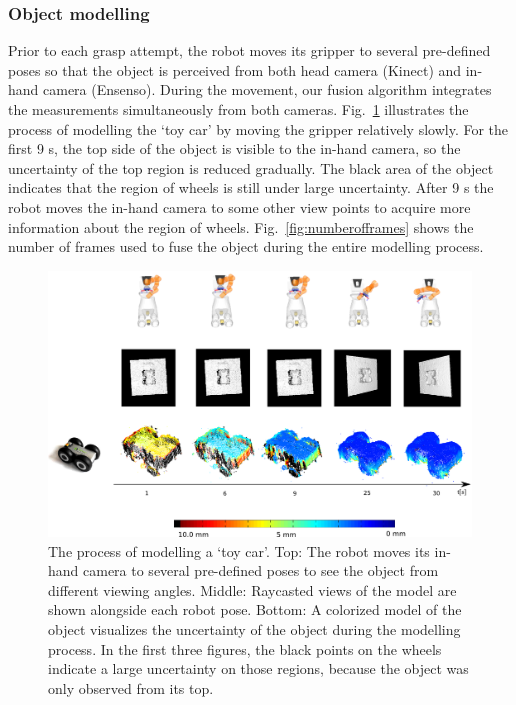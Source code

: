 \subsubsection{Object modelling}
Prior to each grasp attempt, the robot moves its gripper to several pre-defined poses so that the object is perceived from both head camera (Kinect) and in-hand camera (Ensenso). During the movement, our fusion algorithm integrates the measurements simultaneously from both cameras. Fig.~\ref{fig:time_evolution} illustrates the process of modelling the `toy car' by moving the gripper relatively slowly. For the first 9 s, the top side of the object is visible to the in-hand camera, so the uncertainty of the top region is reduced gradually. The black area of the object indicates that the region of wheels is still under large uncertainty. After 9 s the robot moves the in-hand camera to some other view points to acquire more information about the region of wheels. Fig.~\ref{fig:numberofframes} shows the number of frames used to fuse the object during the entire modelling process.  


\begin{figure}[!htbp]
\centering
\includegraphics[width=1\linewidth]{figure/time_evolution.png}%
%
\caption{The process of modelling a `toy car'. Top: The robot moves its in-hand camera to several pre-defined poses to see the object from different viewing angles. Middle: Raycasted views of the model are shown alongside each robot pose. Bottom: A colorized model of the object visualizes the uncertainty of the object during the modelling process. In the first three figures, the black points on the wheels indicate a large uncertainty on those regions, because the object was only observed from its top.}
\label{fig:time_evolution}
\end{figure}

